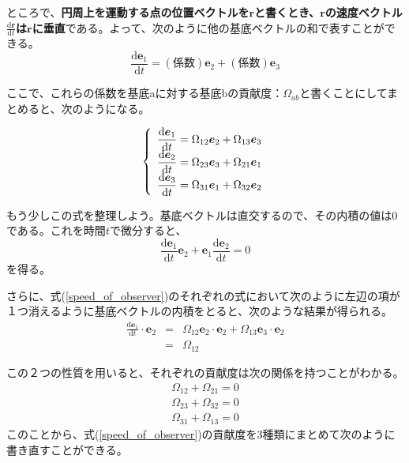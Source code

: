 \documentclass[twocolumn,a4j,10pt]{jarticle}
\begin{document}
ところで、\textbf{円周上を運動する点の位置ベクトルを$\bm{r}$と書くとき、$\bm{r}$の速度ベクトル$\frac{\mathrm{d}\bm{r}}{\mathrm{d}t}$は$\bm{r}$に垂直}である。よって、次のように他の基底ベクトルの和で表すことができる。
\begin{equation}
  \frac{\mathrm{d} \bm{e}_1}{\mathrm{d} t} = (係数)\bm{e}_2 + (係数)\bm{e}_3 \nonumber
\end{equation}

ここで、これらの係数を基底aに対する基底bの貢献度：$\Omega_{ab}$と書くことにしてまとめると、次のようになる。

\begin{equation}
\renewcommand{\arraystretch}{1.5}
  \left\{ \begin{array}{c}
\displaystyle \frac{\mathrm{d} \bm{e}_1}{\mathrm{d} t} = \Omega_{12} \bm{e}_2 + \Omega_{13} \bm{e}_3 \\
\displaystyle \frac{\mathrm{d} \bm{e}_2}{\mathrm{d} t} = \Omega_{23} \bm{e}_3 + \Omega_{21} \bm{e}_1 \\
\displaystyle \frac{\mathrm{d} \bm{e}_3}{\mathrm{d} t} = \Omega_{31} \bm{e}_1 + \Omega_{32} \bm{e}_2
  \label{speed_of_observer}
  \end{array} \right.
\renewcommand{\arraystretch}{1}
\end{equation}\newline

もう少しこの式を整理しよう。基底ベクトルは直交するので、その内積の値は0である。これを時間$t$で微分すると、
\begin{equation}
  \frac{\mathrm{d} \bm{e}_1}{\mathrm{d} t} \bm{e}_2 + \bm{e}_1 \frac{\mathrm{d} \bm{e}_2}{\mathrm{d} t} = 0 \nonumber
\end{equation}
を得る。

さらに、式(\ref{speed_of_observer})のそれぞれの式において次のように左辺の項が１つ消えるように基底ベクトルの内積をとると、次のような結果が得られる。
\begin{eqnarray}
  \frac{\mathrm{d} \bm{e}_1}{\mathrm{d} t} \cdot \bm{e}_2 &=& \Omega_{12} \bm{e}_2 \cdot \bm{e}_2 + \Omega_{13} \bm{e}_3 \cdot \bm{e}_2 \nonumber \\
  &=& \Omega_{12} \nonumber
\end{eqnarray}

この２つの性質を用いると、それぞれの貢献度は次の関係を持つことがわかる。
\begin{eqnarray}
  \Omega_{12} + \Omega_{21} = 0 \nonumber \\
  \Omega_{23} + \Omega_{32} = 0 \nonumber \\
  \Omega_{31} + \Omega_{13} = 0 \nonumber
\end{eqnarray}
このことから、式(\ref{speed_of_observer})の貢献度を3種類にまとめて次のように書き直すことができる。
\end{document}

